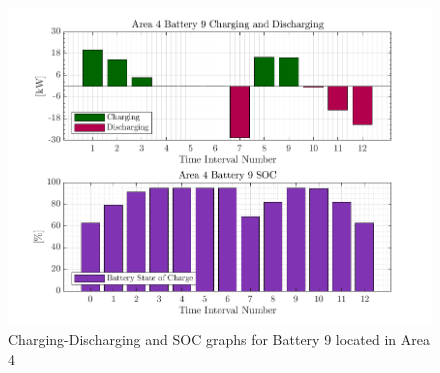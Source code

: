 \documentclass{article}
\begin{document}
\begin{figure}[h!]
    \centering
    \includegraphics[width=\linewidth]{../figures/T12-pv10-batt15-genCost-peakShave/macroItr_5_genCost_peakShave_Battery_9_alpha_0.001.png}
    \caption{Charging-Discharging and SOC graphs for Battery 9 located in Area 4}
    \label{fig:battery_charging_discharging}
\end{figure}
    

\lipsum[1]
\end{document}
